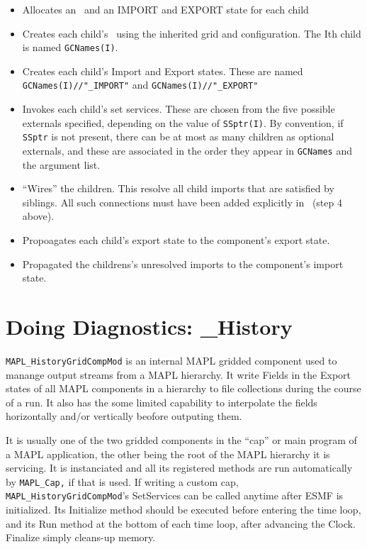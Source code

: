 \begin{itemize}
\item
   Allocates an \egc\  and an IMPORT and EXPORT state for each child
\item
   Creates each child's \egc\  using the inherited grid and
   configuration. The Ith child is named {\tt GCNames(I)}.
\item
   Creates each child's Import and Export states. These are named
   {\tt GCNames(I)//"\_IMPORT"} and {\tt GCNames(I)//"\_EXPORT"}
\item
   Invokes each child's set services. These are chosen from the five possible
   externals specified, depending on the value of {\tt SSptr(I)}. By convention,
   if {\tt SSptr} is not present, there can be at most as many children as
   optional externals, and these are associated in the order they appear in
   {\tt GCNames} and the argument list.
\item
   ``Wires'' the children. This resolve all child imports that are satisfied
   by siblings. All such connections must have been added explicitly
   in \ssv\  (step 4 above).
\item
   Propoagates each child's export state to the component's export state.
\item
   Propagated the childrens's unresolved imports to the component's import state. 
\end{itemize}


\section{Doing Diagnostics: \ggn\_History}

{\tt MAPL\_HistoryGridCompMod} is an internal MAPL gridded component 
   used to manange output streams from a MAPL hierarchy. It write Fields in the
   Export states of all MAPL components in a hierarchy to file collections
   during the course of a run. It also has the some limited capability to interpolate
   the fields horizontally and/or vertically beofore outputing them. 
 
   It is usually one of the
   two gridded components in the ``cap'' or main program of a MAPL application,
   the other being the root of the MAPL hierarchy it is servicing. It is 
   instanciated and all its registered methods are run automatically by 
   {\tt MAPL\_Cap,} if that is used.
   If writing a custom cap, {\tt MAPL\_HistoryGridCompMod}'s SetServices can be 
   called anytime after ESMF is initialized.
   Its Initialize method should be executed before entering the time loop, and its
   Run method at the bottom of each time loop, after advancing the Clock. Finalize
   simply cleans-up memory. 


